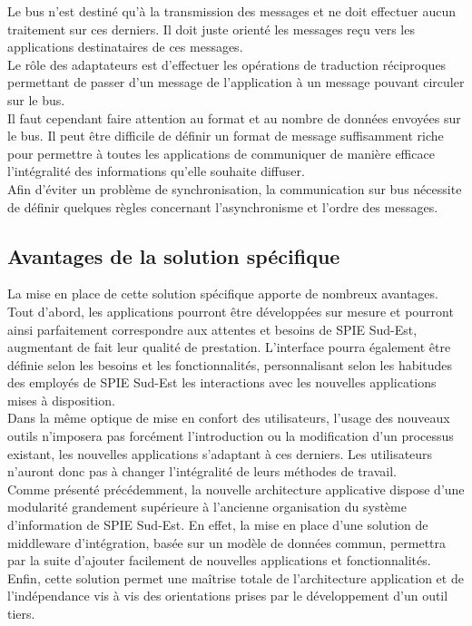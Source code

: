 Le bus n’est destiné qu’à la transmission des messages et ne doit effectuer aucun traitement sur ces derniers. Il doit juste orienté les messages reçu vers les applications destinataires de ces messages. \\

Le rôle des adaptateurs est d’effectuer les opérations de traduction réciproques permettant de passer d’un message de l’application à un message pouvant circuler sur le bus. \\

Il faut cependant faire attention au format et au nombre de données envoyées sur le bus. Il peut être difficile de définir un format de message suffisamment riche pour permettre à toutes les applications de communiquer de manière efficace l’intégralité des informations qu’elle souhaite diffuser. \\

Afin d’éviter un problème de synchronisation, la communication sur bus nécessite de définir quelques règles concernant l’asynchronisme et l’ordre des messages. 

\subsection{Avantages de la solution spécifique}

La mise en place de cette solution spécifique apporte de nombreux avantages. Tout d’abord, les applications pourront être développées sur mesure et pourront ainsi parfaitement correspondre aux attentes et besoins de SPIE Sud-Est, augmentant de fait leur qualité de prestation. L’interface pourra également être définie selon les besoins et les fonctionnalités, personnalisant selon les habitudes des employés de SPIE Sud-Est les interactions avec les nouvelles applications mises à disposition. \\

Dans la même optique de mise en confort des utilisateurs, l’usage des nouveaux outils n’imposera pas forcément l’introduction ou la modification d’un processus existant, les nouvelles applications s’adaptant à ces derniers. Les utilisateurs n’auront donc pas à changer l’intégralité de leurs méthodes de travail. \\

Comme présenté précédemment, la nouvelle architecture applicative dispose d’une modularité grandement supérieure à l’ancienne organisation du système d’information de SPIE Sud-Est. En effet, la mise en place d’une solution de middleware d’intégration, basée sur un modèle de données commun, permettra par la suite d’ajouter facilement de nouvelles applications et fonctionnalités. \\

Enfin, cette solution permet une maîtrise totale de l’architecture application et de l’indépendance vis à vis des orientations prises par le développement d’un outil tiers. \\
